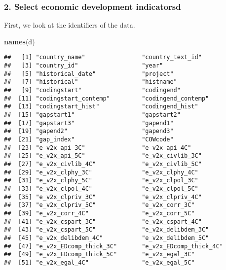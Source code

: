 \documentclass[
]{article}
\newenvironment{Shaded}{\begin{snugshade}}{\end{snugshade}}
\newcommand{\FunctionTok}[1]{\textcolor[rgb]{0.13,0.29,0.53}{\textbf{#1}}}
\newcommand{\NormalTok}[1]{#1}
\begin{document}
\hypertarget{select-economic-development-indicatorsd}{%
\subsubsection{2. Select economic development
indicatorsd}\label{select-economic-development-indicatorsd}}

First, we look at the identifiers of the data.

\begin{Shaded}
\begin{Highlighting}[]
\FunctionTok{names}\NormalTok{(d)}
\end{Highlighting}
\end{Shaded}

\begin{verbatim}
##   [1] "country_name"                "country_text_id"            
##   [3] "country_id"                  "year"                       
##   [5] "historical_date"             "project"                    
##   [7] "historical"                  "histname"                   
##   [9] "codingstart"                 "codingend"                  
##  [11] "codingstart_contemp"         "codingend_contemp"          
##  [13] "codingstart_hist"            "codingend_hist"             
##  [15] "gapstart1"                   "gapstart2"                  
##  [17] "gapstart3"                   "gapend1"                    
##  [19] "gapend2"                     "gapend3"                    
##  [21] "gap_index"                   "COWcode"                    
##  [23] "e_v2x_api_3C"                "e_v2x_api_4C"               
##  [25] "e_v2x_api_5C"                "e_v2x_civlib_3C"            
##  [27] "e_v2x_civlib_4C"             "e_v2x_civlib_5C"            
##  [29] "e_v2x_clphy_3C"              "e_v2x_clphy_4C"             
##  [31] "e_v2x_clphy_5C"              "e_v2x_clpol_3C"             
##  [33] "e_v2x_clpol_4C"              "e_v2x_clpol_5C"             
##  [35] "e_v2x_clpriv_3C"             "e_v2x_clpriv_4C"            
##  [37] "e_v2x_clpriv_5C"             "e_v2x_corr_3C"              
##  [39] "e_v2x_corr_4C"               "e_v2x_corr_5C"              
##  [41] "e_v2x_cspart_3C"             "e_v2x_cspart_4C"            
##  [43] "e_v2x_cspart_5C"             "e_v2x_delibdem_3C"          
##  [45] "e_v2x_delibdem_4C"           "e_v2x_delibdem_5C"          
##  [47] "e_v2x_EDcomp_thick_3C"       "e_v2x_EDcomp_thick_4C"      
##  [49] "e_v2x_EDcomp_thick_5C"       "e_v2x_egal_3C"              
##  [51] "e_v2x_egal_4C"               "e_v2x_egal_5C"              

\end{verbatim}
\end{document}
